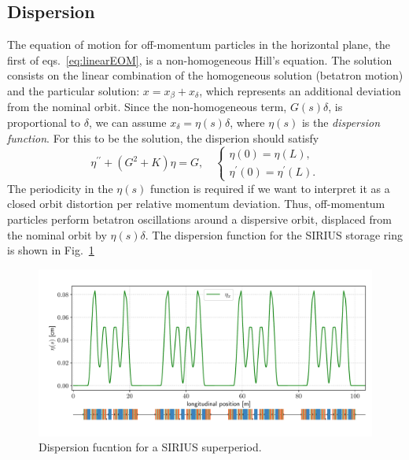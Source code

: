 \subsection{Dispersion}
The equation of motion for off-momentum particles in the horizontal plane, the first of eqs.~\eqref{eq:linearEOM}, is a non-homogeneous Hill's equation. The solution consists on the linear combination of the homogeneous solution (betatron motion) and the particular solution: $x=x_\beta+ x_\delta$, which represents an additional deviation from the nominal orbit. Since the non-homogeneous term, $G(s)\delta$, is proportional to $\delta$, we can assume  $x_{\delta} = \eta(s)\delta$, where $\eta(s)$ is the \textit{dispersion function}. For this to be the solution, the disperion should satisfy
    \begin{equation*}
        \eta^{\prime\prime}+(G^2+K)\eta=G,\quad
        \begin{cases}
            \eta(0) = \eta(L),\\
            \eta^\prime(0) = \eta^\prime(L).
        \end{cases}
    \end{equation*}
    The periodicity in the $\eta(s)$ function is required if we want to interpret it as a closed orbit distortion per relative momentum deviation. Thus, off-momentum particles perform betatron oscillations around a dispersive orbit, displaced from the nominal orbit by $\eta(s)\delta$. The dispersion function for the SIRIUS storage ring is shown in Fig.~\ref{dispersion_func}
    \begin{figure}[htb]
        \centering
        \includegraphics[width=\textwidth]{Images/dispersion.pdf}
        \caption[Dispersion function for a SIRIUS superperiod.]{Dispersion fucntion for a SIRIUS superperiod.}
        \label{dispersion_func}
    \end{figure}
